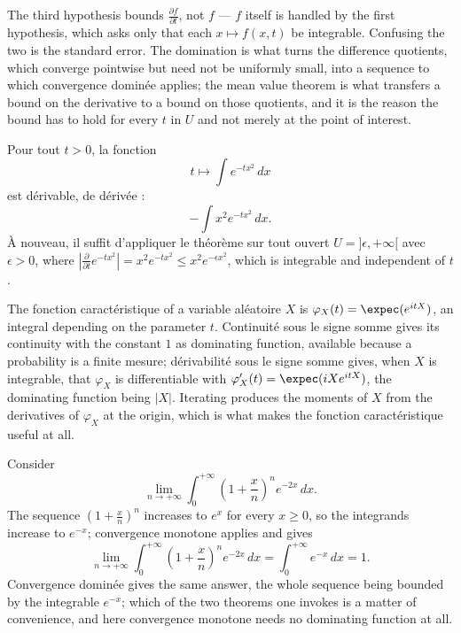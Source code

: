 \begin{remark}
  The third hypothesis bounds $\frac{\partial f}{\partial t}$, not $f$ --- $f$ itself
  is handled by the first hypothesis, which asks only that each $x \mapsto f(x,t)$ be
  integrable. Confusing the two is the standard error. The domination is what turns
  the difference quotients, which converge pointwise but need not be uniformly small,
  into a sequence to which convergence dominée applies; the mean value theorem is
  what transfers a bound on the derivative to a bound on those quotients, and it is
  the reason the bound has to hold for every $t$ in $U$ and not merely at the point
  of interest.
\end{remark}

\begin{example}
  Pour tout $t > 0$, la fonction
  \[
    t \mapsto \int e^{-tx^{2}} \, dx
  \]
  est dérivable, de dérivée :
  \[
    - \int x^{2} e^{-tx^{2}} \, dx .
  \]
  À nouveau, il suffit d'appliquer le théorème sur tout ouvert $U =
  ]\epsilon,+\infty[$ avec $\epsilon > 0$, where $\left| \frac{\partial}{\partial t} e^{-tx^{2}} \right| =
  x^{2} e^{-tx^{2}} \leq x^{2} e^{-\epsilon x^{2}}$, which is integrable and
  independent of $t$.
\end{example}

\begin{remark}
  The fonction caractéristique of a variable aléatoire $X$ is $\varphi_{X}(t) =
  \expec(e^{itX})$, an integral depending on the parameter $t$. Continuité sous le
  signe somme gives its continuity with the constant $1$ as dominating function,
  available because a probability is a finite mesure; dérivabilité sous le signe
  somme gives, when $X$ is integrable, that $\varphi_{X}$ is differentiable with
  $\varphi_{X}'(t) = \expec(i X e^{itX})$, the dominating function being $|X|$.
  Iterating produces the moments of $X$ from the derivatives of $\varphi_{X}$ at the
  origin, which is what makes the fonction caractéristique useful at all.
\end{remark}

\begin{example}
  Consider
  \[
    \lim_{n \to +\infty} \int_{0}^{+\infty}
      \left( 1 + \frac{x}{n} \right)^{n} e^{-2x} \, dx .
  \]
  The sequence $\left( 1 + \frac{x}{n} \right)^{n}$ increases to $e^{x}$ for every $x
  \geq 0$, so the integrands increase to $e^{-x}$; convergence monotone applies and
  gives
  \[
    \lim_{n \to +\infty} \int_{0}^{+\infty}
      \left( 1 + \frac{x}{n} \right)^{n} e^{-2x} \, dx
    = \int_{0}^{+\infty} e^{-x} \, dx = 1 .
  \]
  Convergence dominée gives the same answer, the whole sequence being bounded by the
  integrable $e^{-x}$; which of the two theorems one invokes is a matter of
  convenience, and here convergence monotone needs no dominating function at all.
\end{example}

